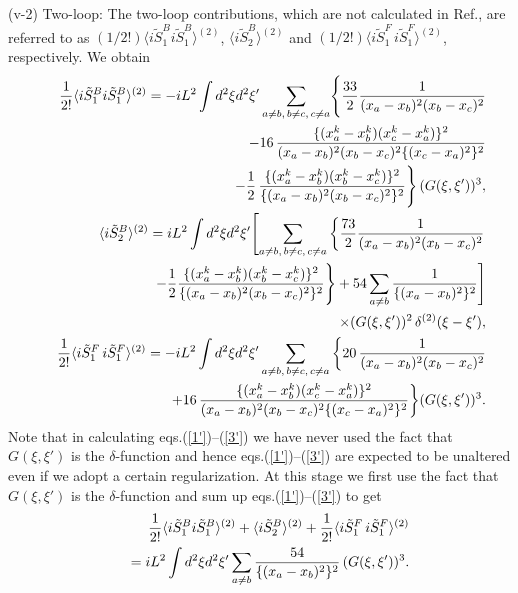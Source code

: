 \documentclass[a4paper,12pt]{article}
\newcommand{\nn}{\nonumber\\}
\newcommand{\vev}[1]{\langle #1 \rangle}
\begin{document}
(v-2) Two-loop:
The two-loop contributions, which are not calculated in Ref.\cite{SY},
are referred to as $(1/2!)\vev{i\tilde{S}_{1}^B
i\tilde{S}_{1}^B}^{(2)}$, $\vev{i\tilde{S}_{2}^B}^{(2)}$ and
$(1/2!) \vev{i\tilde{S}_{1}^F \,i\tilde{S}_{1}^F}^{(2)}$,
respectively. We obtain
\begin{eqnarray}
  &&\frac{1}{2!}\vev{i\tilde{S}_{1}^B
    i\tilde{S}_{1}^B}^{(2)} =-i L^2\int d^2 \xi d^2 \xi'
    \sum_{a\ne b,\,b\ne c,\,c\ne a}\Biggl\{\frac{33}{2}
        \frac{1}{(x_a-x_b)^2(x_b-x_c)^2}\nn
   &&\hspace{22ex}-16\,\frac{\{(x_a^k-x_b^k)(x_c^k-x_a^k)\}^2}
	{(x_a-x_b)^2(x_b-x_c)^2\{(x_c-x_a)^2\}^2}\nn
   &&\hspace{22ex}-\frac{1}{2}\,
    \frac{\{(x_a^k-x_b^k)(x_b^k-x_c^k)\}^2}{\{(x_a-x_b)^2(x_b-x_c)^2\}^2}
	\Biggr\}\,(G(\xi,\xi'))^3,\label{1'}\\
  &&\vev{i\tilde{S}_{2}^B}^{(2)}=iL^2\int d^2 \xi d^2\xi'
	\Biggl[\sum_{a\ne b,\, b\ne c,\,c\ne a}
	\left\{\frac{73}{2}\frac{1}{(x_a-x_b)^2(x_b-x_c)^2}\right.\nn
  &&\hspace{18ex}-\frac{1}{2}\frac{\{(x_a^k-x_b^k)(x_b^k-x_c^k)\}^2}
	{\{(x_a-x_b)^2(x_b-x_c)^2\}^2}\Biggr\}
	+54 \sum_{a\ne b} \frac{1}{\{(x_a-x_b)^2\}^2}\Biggr]\nn
  &&\hspace{20ex}
	\times (G(\xi,\xi'))^2\,\delta^{(2)}(\xi-\xi'),\label{2'}\\
  &&\frac{1}{2!} \vev{i\tilde{S}_{1}^F
	\,i\tilde{S}_{1}^F}^{(2)} =-iL^2\int d^2 \xi d^2 \xi'
	\sum_{a\ne b,\,b\ne c,\,c\ne a}
	\bigg\{20\,\frac{1}{(x_a-x_b)^2(x_b-x_c)^2}\nn
   &&\hspace{15ex}+16\,\frac{\{(x_a^k-x_b^k)(x_c^k-x_a^k)\}^2}
	{(x_a-x_b)^2(x_b-x_c)^2\{(x_c-x_a)^2\}^2}
	\bigg\}(G(\xi,\xi'))^3. \label{3'}
\end{eqnarray}
Note that in calculating eqs.(\ref{1'})--(\ref{3'}) we have never used
the fact that $G(\xi,\xi')$ is the $\delta$-function and hence
eqs.(\ref{1'})--(\ref{3'}) are expected to be unaltered
even if we adopt a certain regularization.
At this stage we first use the fact that $G(\xi,\xi')$ is the
$\delta$-function and sum up eqs.(\ref{1'})--(\ref{3'}) to get
\begin{eqnarray}
 &&\frac{1}{2!}\vev{i\tilde{S}_{1}^B
    i\tilde{S}_{1}^B}^{(2)}+\vev{i\tilde{S}_{2}^B}^{(2)}
	  +\frac{1}{2!} \vev{i\tilde{S}_{1}^F
	\,i\tilde{S}_{1}^F}^{(2)}\nn
 &&\hspace{1ex}=iL^2\int d^2 \xi d^2\xi'\sum_{a\ne b}
	\frac{54}{\{(x_a-x_b)^2\}^2}\,(G(\xi,\xi'))^3.\label{eq:2Lsum}
\end{eqnarray}
\end{document}
